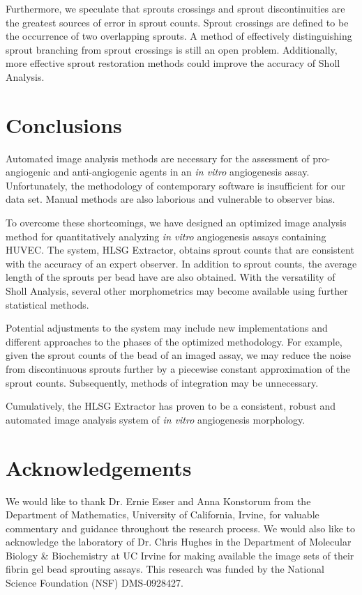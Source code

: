 \documentclass{sig-alternate}
\newcommand{\invitro}{\emph{in vitro} }
\begin{document}
	Furthermore, we speculate that sprouts crossings and sprout
	discontinuities are the greatest sources of error in sprout counts.
	Sprout crossings are defined to be the occurrence of two overlapping
	sprouts. A method of effectively distinguishing sprout branching from
	sprout crossings is still an open problem. Additionally, more
	effective sprout restoration methods could improve the accuracy of
	Sholl Analysis.

\section{Conclusions} %
\label{sec:Conclusions}
	Automated image analysis methods are necessary for the assessment of
	pro-angiogenic and anti-angiogenic agents in an \invitro angiogenesis
	assay. Unfortunately, the methodology of contemporary software is
	insufficient for our data set. Manual methods are also laborious and
	vulnerable to observer bias.

	To overcome these shortcomings, we have designed an optimized image
	analysis method for quantitatively analyzing \invitro angiogenesis
	assays containing HUVEC. The system, HLSG Extractor, obtains sprout
	counts that are consistent with the accuracy of an expert observer. In
	addition to sprout counts, the average length of the sprouts per bead
	have are also obtained. With the versatility of Sholl Analysis,
	several other morphometrics may become available using further
	statistical methods.

	Potential adjustments to the system may include new implementations
	and different approaches to the phases of the optimized methodology.
	For example, given the sprout counts of the bead of an imaged assay,
	we may reduce the noise from discontinuous sprouts further by a
	piecewise constant approximation of the sprout counts. Subsequently,
	methods of integration may be unnecessary. 

	Cumulatively, the HLSG Extractor has proven to be a consistent, robust
	and automated image analysis system of \invitro angiogenesis
	morphology.

\section{Acknowledgements} %
\label{sec:Acknowledgements}
	We would like to thank Dr. Ernie Esser and Anna Konstorum from the
	Department of Mathematics, University of California, Irvine, for
	valuable commentary and guidance throughout the research process. We
	would also like to acknowledge the laboratory of Dr. Chris Hughes in
	the Department of Molecular Biology \& Biochemistry at UC Irvine for
	making available the image sets of their fibrin gel bead sprouting
	assays. This research was funded by the National Science Foundation
	(NSF) DMS-0928427.
\end{document}
